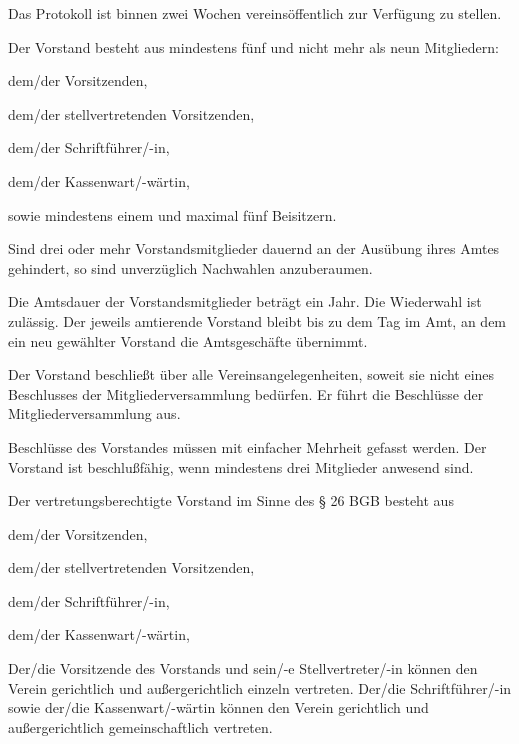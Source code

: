 \documentclass[draft]{scrartcl}
\begin{document}
\begin{contract}
Das Protokoll ist binnen zwei Wochen vereinsöffentlich zur Verfügung zu
stellen.


Der Vorstand besteht aus mindestens fünf und nicht mehr als neun Mitgliedern:
\begin{compactenum}[\hspace{2em}1.]
  \item dem/der Vorsitzenden,
  \item dem/der stellvertretenden Vorsitzenden,
  \item dem/der Schriftführer/-in,
  \item dem/der Kassenwart/-wärtin,
  \item sowie mindestens einem und maximal fünf Beisitzern.
\end{compactenum}

Sind drei oder mehr Vorstandsmitglieder dauernd an der Ausübung ihres Amtes
gehindert, so sind unverzüglich Nachwahlen anzuberaumen.

Die Amtsdauer der Vorstandsmitglieder beträgt ein Jahr. Die Wiederwahl ist
zulässig. Der jeweils amtierende Vorstand bleibt bis zu dem Tag im Amt, an dem
ein neu gewählter Vorstand die Amtsgeschäfte übernimmt.

Der Vorstand beschließt über alle Vereinsangelegenheiten, soweit sie nicht
eines Beschlusses der Mitgliederversammlung bedürfen. Er führt die Beschlüsse
der Mitgliederversammlung aus.

Beschlüsse des Vorstandes müssen mit einfacher Mehrheit gefasst werden. Der
Vorstand ist beschlußfähig, wenn mindestens drei Mitglieder anwesend sind.


Der vertretungsberechtigte Vorstand im Sinne des § 26 BGB besteht aus 
\begin{compactenum}[\hspace{2em}1.]
  \item dem/der Vorsitzenden,
  \item dem/der stellvertretenden Vorsitzenden,
  \item dem/der Schriftführer/-in,
  \item dem/der Kassenwart/-wärtin,
\end{compactenum}

Der/die Vorsitzende des Vorstands und sein/-e Stellvertreter/-in können den
Verein gerichtlich und außergerichtlich einzeln vertreten. Der/die Schriftführer/-in
sowie der/die Kassenwart/-wärtin können den Verein gerichtlich und
außergerichtlich gemeinschaftlich vertreten. 


\end{contract}
\end{document}
